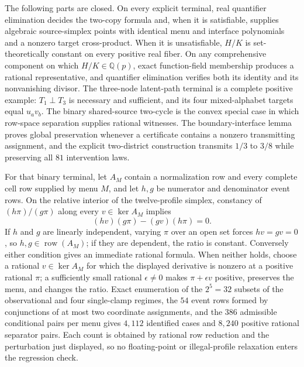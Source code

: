 The following parts are closed.  On every explicit terminal, real quantifier elimination decides the two-copy formula and, when it is satisfiable, supplies algebraic source-simplex points with identical menu and interface polynomials and a nonzero target cross-product.  When it is unsatisfiable, \(H/K\) is set-theoretically constant on every positive real fiber.  On any comprehensive component on which \(H/K\in\mathbb Q(p)\), exact function-field membership produces a rational representative, and quantifier elimination verifies both its identity and its nonvanishing divisor.  The three-node latent-path terminal is a complete positive example: \(T_1\perp T_3\) is necessary and sufficient, and its four mixed-alphabet targets equal \(u_av_b\).  The binary shared-source two-cycle is the convex special case in which row-space separation supplies rational witnesses.  The boundary-interface lemma proves global preservation whenever a certificate contains a nonzero transmitting assignment, and the explicit two-district construction transmits \(1/3\) to \(3/8\) while preserving all \(81\) intervention laws.

For that binary terminal, let \(A_M\) contain a normalization row and every complete cell row supplied by menu \(M\), and let \(h,g\) be numerator and denominator event rows.  On the relative interior of the twelve-profile simplex, constancy of \((h\pi)/(g\pi)\) along every \(v\in\ker A_M\) implies
\[
 (hv)(g\pi)-(gv)(h\pi)=0.
\]
If \(h\) and \(g\) are linearly independent, varying \(\pi\) over an open set forces \(hv=gv=0\), so \(h,g\in\operatorname{row}(A_M)\); if they are dependent, the ratio is constant.  Conversely either condition gives an immediate rational formula.  When neither holds, choose a rational \(v\in\ker A_M\) for which the displayed derivative is nonzero at a positive rational \(\pi\); a sufficiently small rational \(\epsilon\ne0\) makes \(\pi+\epsilon v\) positive, preserves the menu, and changes the ratio.  Exact enumeration of the \(2^5=32\) subsets of the observational and four single-clamp regimes, the \(54\) event rows formed by conjunctions of at most two coordinate assignments, and the \(386\) admissible conditional pairs per menu gives \(4{,}112\) identified cases and \(8{,}240\) positive rational separator pairs.  Each count is obtained by rational row reduction and the perturbation just displayed, so no floating-point or illegal-profile relaxation enters the regression check.

